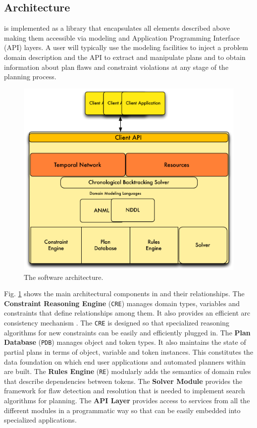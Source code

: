 \subsection{Architecture}
\label{sec:europa:arch}

\eu is implemented as a library that encapsulates all elements
described above making them accessible via modeling and Application
Programming Interface (API) layers.  A user will typically use the
modeling facilities to inject a problem domain description and the
API to extract and manipulate plans and to obtain information about
plan flaws and constraint violations at any stage of the planning
process.

\begin{figure}
\centering
\includegraphics[scale=0.4]{figs/EUROPA-Architecture.pdf}
\caption{\small The \eu software architecture.}
\label{fig:europa-architecture}
\end{figure}

Fig. \ref{fig:europa-architecture} shows the main architectural
components in \eu and their relationships. The \textbf{Constraint
  Reasoning Engine} (\texttt{CRE}) manages domain types, variables and
constraints that define relationships among them. It also provides an
efficient arc consistency mechanism \cite{mackworth77}. The
\texttt{CRE} is designed so that specialized reasoning algorithms for
new constraints can be easily and efficiently plugged in. The
\textbf{Plan Database} (\texttt{PDB}) manages object and token
types. It also maintains the state of partial plans in terms of
object, variable and token instances. This constitutes the data
foundation on which end user applications and automated planners
within \eu are built. The \textbf{Rules Engine} (\texttt{RE})
modularly adds the semantics of domain rules that describe
dependencies between tokens. The \textbf{Solver Module} provides the
framework for flaw detection and resolution that is needed to
implement search algorithms for planning. The \textbf{API Layer}
provides access to services from all the different modules in a
programmatic way so that \eu can be easily embedded into specialized
applications.

